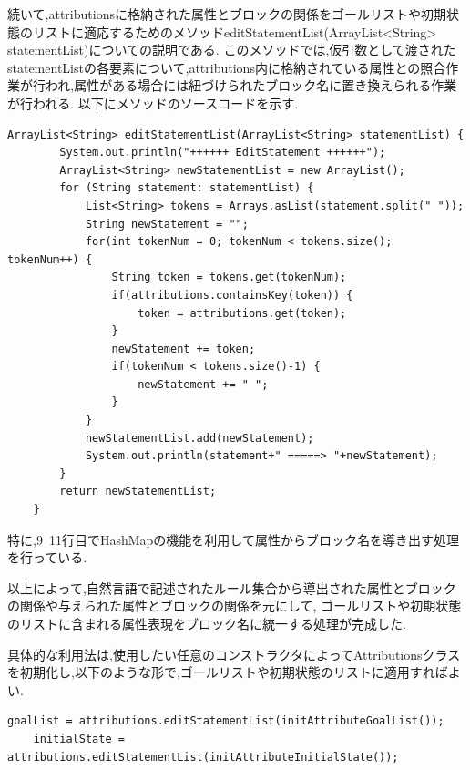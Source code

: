 \documentclass[uplatex,12pt]{jsarticle}
\begin{document}
続いて,attributionsに格納された属性とブロックの関係をゴールリストや初期状態のリストに適応するためのメソッドeditStatementList(ArrayList<String> statementList)についての説明である.
このメソッドでは,仮引数として渡されたstatementListの各要素について,attributions内に格納されている属性との照合作業が行われ,属性がある場合には紐づけられたブロック名に置き換えられる作業が行われる.
以下にメソッドのソースコードを示す.
\begin{lstlisting}[caption=editStatementListメソッドの実装, label=mid]
    ArrayList<String> editStatementList(ArrayList<String> statementList) {
		System.out.println("++++++ EditStatement ++++++");
		ArrayList<String> newStatementList = new ArrayList();
		for (String statement: statementList) {
			List<String> tokens = Arrays.asList(statement.split(" "));
			String newStatement = "";
			for(int tokenNum = 0; tokenNum < tokens.size(); tokenNum++) {
				String token = tokens.get(tokenNum);
				if(attributions.containsKey(token)) {
					token = attributions.get(token);
				}
				newStatement += token;
				if(tokenNum < tokens.size()-1) {
					newStatement += " ";
				}
			}
			newStatementList.add(newStatement);
			System.out.println(statement+" =====> "+newStatement);
		}
		return newStatementList;
	}
\end{lstlisting}
特に,9~11行目でHashMapの機能を利用して属性からブロック名を導き出す処理を行っている.

以上によって,自然言語で記述されたルール集合から導出された属性とブロックの関係や与えられた属性とブロックの関係を元にして,
ゴールリストや初期状態のリストに含まれる属性表現をブロック名に統一する処理が完成した.

具体的な利用法は,使用したい任意のコンストラクタによってAttributionsクラスを初期化し,以下のような形で,ゴールリストや初期状態のリストに適用すればよい.
\begin{lstlisting}[caption=editStatementListの利用, label=mid]
    goalList = attributions.editStatementList(initAttributeGoalList());
	initialState = attributions.editStatementList(initAttributeInitialState());
\end{lstlisting}
\end{document}
